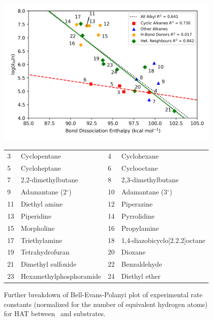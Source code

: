 \begin{figure}[!htbp]
  \centering
  \includegraphics[width=\textwidth]{figures/bep-breakdown}
  \begin{tabularx}{\textwidth}{| l X l X |}
    \hline
    3 & Cyclopentane & 4 & Cyclohexane \\
    5 & Cycloheptane & 6 & Cyclooctane \\
    7 & 2,2-dimethylbutane & 8 & 2,3-dimethylbutane \\
    9 & Adamantane (2$^\circ$) & 10 & Adamantane (3$^\circ$) \\
    11 & Diethyl amine & 12 & Piperazine \\
    13 & Piperidine & 14 & Pyrrolidine \\
    15 & Morpholine & 16 & Propylamine \\
    17 & Triethylamine & 18 & 1,4-diazobicyclo[2.2.2]octane \\
    19 & Tetrahydrofuran & 20 & Dioxane \\
    21 & Dimethyl sulfoxide & 22 & Benzaldehyde \\
    23 & Hexamethylphosphoramide & 24 & Diethyl ether \\
    \hline
  \end{tabularx}
  \caption[Further breakdown of Bell-Evans-Polanyi plot of experimental rate
  constants (normalized for the number of equivalent hydrogen atoms) for HAT
  between \cumo\ and alkyl substrates against BDEs calculated using the
  ROCBS-QB3 method.]{Further breakdown of Bell-Evans-Polanyi plot of
  experimental rate constants (normalized for the number of equivalent hydrogen
  atoms) for HAT between \cumo\ and  substrates.} \label{fig:bep-breakdown}
\end{figure}

